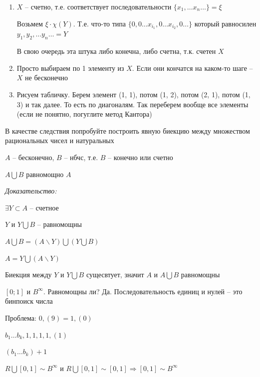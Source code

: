 \documentclass[12pt]{article}
\begin{document}
\begin{Proof}{}

\begin{enumerate}
    \item $X$ -- счетно, т.е. соответствует последовательности $\{x_1, \ldots x_n \ldots\} = \xi$
    
    Возьмем $\xi \cdot \chi(Y)$. Т.е. что-то типа $\{ 0, 0 \ldots x_{i_1}, 0 \ldots x_{i_2}, 0 \ldots \}$ который равносилен $y_1, y_2, \ldots y_n \ldots = Y$

    В свою очередь эта штука либо конечна, либо счетна, т.к. счетен $X$

    \item Просто выбираем по 1 элементу из $X$. Если они кончатся на каком-то шаге -- $X$ не бесконечно
    
    \item Рисуем табличку. Берем элемент (1, 1), потом (1, 2), потом (2, 1), потом (1, 3) и так далее. То есть по диагоналям. Так переберем вообще все элементы (если не понятно, погуглите метод Кантора)
\end{enumerate}

\end{Proof}

\begin{Exercise}{}
    В качестве следствия попробуйте построить явную биекцию между множеством рациональных чисел и натуральных
\end{Exercise}

\begin{theo}{}
    $A$ -- бесконечно, $B$ -- нбчс, т.е. $B$ -- конечно или счетно

    $A \bigcup B$ равномощно $A$
\end{theo}

\textit{Доказательство:}

$\exists Y \subset A$ -- счетное

$Y$ и $Y \bigcup B$ -- равномощны

$A \bigcup B = (A \backslash Y) \bigcup (Y \bigcup B)$

$A = Y \bigcup (A \backslash Y)$

Биекция между $Y$ и $Y \bigcup B$ сущесвтует, значит $A$ и $A \bigcup B$ равномощны

\begin{Example}{}
    $[0; 1]$ и $B^\infty$. Равномощны ли? Да. Последовательность единиц и нулей -- это бинпоиск числа

    Проблема: $0,(9) = 1,(0)$

    $b_1 \ldots b_k, 1, 1, 1, 1, (1)$

    $(b_1 \ldots b_k) + 1$

    $R \bigcup [0, 1] \sim B^{\infty}$ и $R \bigcup [0, 1] \sim [0, 1] \Rightarrow [0, 1] \sim B^{\infty}$
\end{Example}
\end{document}
